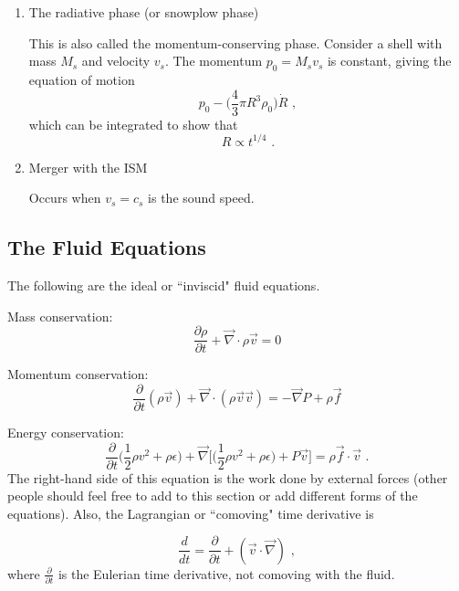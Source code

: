\begin{enumerate}
    \item The radiative phase (or snowplow phase)
    
    This is also called the momentum-conserving phase. Consider a shell with mass $M_s$ and velocity $v_s$. The momentum $p_0 = M_s v_s$ is constant, giving the equation of motion
    \begin{equation}
    p_0 - \biggl(\frac{4}{3}\pi R^3 \rho_0 \biggr) \dot{R}\,\, ,
    \end{equation}
    which can be integrated to show that
    \begin{equation}
    R \propto t^{1/4}\,\,.
    \end{equation}
    \item Merger with the ISM
    
    Occurs when $v_s = c_s$ is the sound speed.
\end{enumerate}

\subsection{The Fluid Equations}
The following are the ideal or ``inviscid" fluid equations.

Mass conservation:
\begin{equation}
\frac{\partial \rho}{\partial t} + \vec{\nabla} \cdot \rho \vec{v} = 0
\end{equation}

Momentum conservation:
\begin{equation}
\frac{\partial}{\partial t} (\rho \vec{v}) + \vec{\nabla}\cdot (\rho \vec{v} \vec{v}) = -\vec{\nabla} P + \rho \vec{f}
\end{equation}

Energy conservation:
\begin{equation}
\frac{\partial}{\partial t} \biggl( \frac{1}{2} \rho v^2 + \rho \epsilon \biggr) + \vec{\nabla}\biggl[\biggl(\frac{1}{2}\rho v^2 + \rho \epsilon \biggr) + P \vec{v} \biggr] = \rho \vec{f} \cdot \vec{v}\,\,.
\end{equation}
The right-hand side of this equation is the work done by external forces (other people should feel free to add to this section or add different forms of the equations). Also, the Lagrangian or ``comoving" time derivative is

\begin{equation}
\frac{d}{dt} = \frac{\partial}{\partial t} + (\vec{v} \cdot \vec{\nabla})\,\, ,
\end{equation}
where $\frac{\partial}{\partial t}$ is the Eulerian time derivative, not comoving with the fluid.


